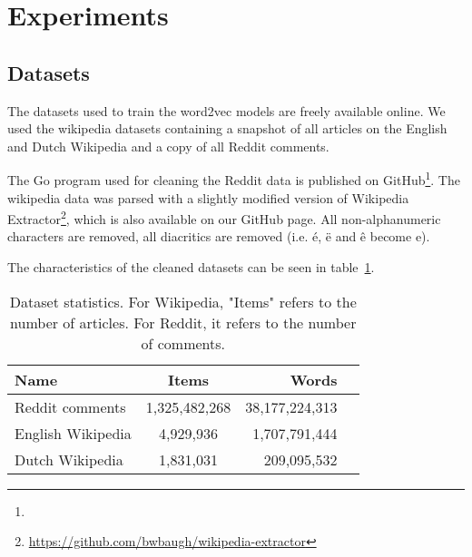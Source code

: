 \section{Experiments}
\label{sec:experiments}

\subsection{Datasets}
The datasets used to train the word2vec models are freely available online. We used the wikipedia datasets containing a snapshot of all articles on the English and Dutch Wikipedia and a copy of all Reddit comments.

The Go program used for cleaning the Reddit data is published on GitHub\footnote{\gh}. The wikipedia data was parsed with a slightly modified version of Wikipedia Extractor\footnote{\url{https://github.com/bwbaugh/wikipedia-extractor}}, which is also available on our GitHub page. All non-alphanumeric characters are removed, all diacritics are removed (i.e. \'e, \"e and \^e become e).

The characteristics of the cleaned datasets can be seen in table~\ref{table:datasets}.

%
%
\begin{table}[ht!]
	\centering
	\label{table:datasets}
	\begin{tabular}{|l|c|r|r|}
	\hline
	Name																												& Items			& Words			\\
	\hline
	Reddit comments \tablefootnote{\url{http://academictorrents.com/details/7690f71ea949b868080401c749e878f98de34d3d}} 	& 1,325,482,268 & 38,177,224,313\\
	English Wikipedia \tablefootnote{\url{https://dumps.wikimedia.org/enwiki/20150901/}}								& 4,929,936		& 1,707,791,444	\\
	Dutch Wikipedia \tablefootnote{\url{https://dumps.wikimedia.org/nlwiki/20150901/}}									& 1,831,031		& 209,095,532	\\
	\hline
	\end{tabular}
	\caption{Dataset statistics. For Wikipedia, "Items" refers to the number of articles. For Reddit, it refers to the number of comments.}
\end{table}

